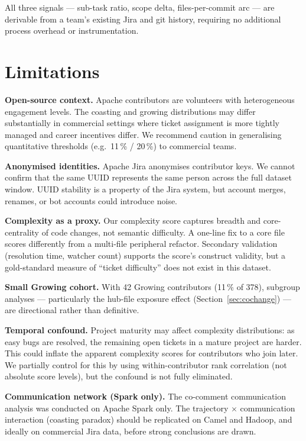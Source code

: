 \documentclass[12pt,a4paper]{article}
\begin{document}
All three signals --- sub-task ratio, scope delta, files-per-commit arc
--- are derivable from a team's existing Jira and git history,
requiring no additional process overhead or instrumentation.

\section{Limitations}

\textbf{Open-source context.}
Apache contributors are volunteers with heterogeneous engagement levels.
The coasting and growing distributions may differ substantially in
commercial settings where ticket assignment is more tightly managed
and career incentives differ.
We recommend caution in generalising quantitative thresholds
(e.g.\ 11\,\% / 20\,\%) to commercial teams.

\textbf{Anonymised identities.}
Apache Jira anonymises contributor keys.
We cannot confirm that the same UUID represents the same person
across the full dataset window.
UUID stability is a property of the Jira system, but account
merges, renames, or bot accounts could introduce noise.

\textbf{Complexity as a proxy.}
Our complexity score captures breadth and core-centrality of code
changes, not semantic difficulty.
A one-line fix to a core file scores differently from a multi-file
peripheral refactor.
Secondary validation (resolution time, watcher count) supports the
score's construct validity, but a gold-standard measure of
``ticket difficulty'' does not exist in this dataset.

\textbf{Small Growing cohort.}
With 42 Growing contributors (11\,\% of 378), subgroup analyses
--- particularly the hub-file exposure effect (Section~\ref{sec:cochange})
--- are directional rather than definitive.

\textbf{Temporal confound.}
Project maturity may affect complexity distributions: as easy bugs
are resolved, the remaining open tickets in a mature project are
harder. This could inflate the apparent complexity scores for
contributors who join later.
We partially control for this by using within-contributor
rank correlation (not absolute score levels), but the confound
is not fully eliminated.

\textbf{Communication network (Spark only).}
The co-comment communication analysis was conducted on Apache Spark
only. The trajectory $\times$ communication interaction
(coasting paradox) should be replicated on Camel and Hadoop,
and ideally on commercial Jira data, before strong conclusions
are drawn.
\end{document}
